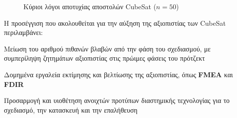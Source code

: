 \documentclass[a4paper,nobib]{tufte-book}
\begin{document}
\begin{figure}
\centering
{}  
\caption[Κύριοι λόγοι αποτυχίας αποστολών CubeSat]{Κύριοι λόγοι αποτυχίας αποστολών CubeSat (\(n=50\)) \parencite{bouwmeester_survey_implementation_2017}}
\label{fig:whyfail}
\end{figure}

Η προσέγγιση που ακολουθείται για την αύξηση της αξιοπιστίας των CubeSat περιλαμβάνει:
\begin{compactitem}
	\item Μείωση του αριθμού πιθανών βλαβών από την φάση του σχεδιασμού, με συμπερίληψη ζητημάτων αξιοπιστίας στις πρώιμες φάσεις του πρότζεκτ
	\item Δομημένα εργαλεία εκτίμησης και βελτίωσης της αξιοπιστίας, όπως \textbf{\acf{FMEA}} και \textbf{\acf{FDIR}} \autocite{faure_lean_satellites_2017,menchinelli_reliability_engineering_2018}
	\item Προσαρμογή και υιοθέτηση ανοιχτών προτύπων διαστημικής τεχνολογίας για το σχεδιασμό, την κατασκευή και την επαλήθευση \autocite{scholz_handbook_free_2021}
\end{compactitem}
\end{document}
